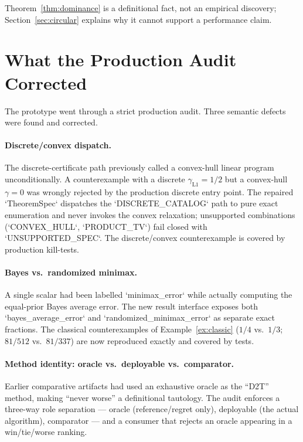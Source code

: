 \documentclass[11pt]{article}
\begin{document}
Theorem~\ref{thm:dominance} is a definitional fact, not an empirical discovery; Section~\ref{sec:circular} explains why it cannot support a performance claim.

\section{What the Production Audit Corrected}\label{sec:audit}

The prototype went through a strict production audit. Three semantic defects were found and corrected.

\paragraph{Discrete/convex dispatch.}
The discrete-certificate path previously called a convex-hull linear program unconditionally. A counterexample with a discrete $\gamma_{\mathrm{L1}}=1/2$ but a convex-hull $\gamma=0$ was wrongly rejected by the production discrete entry point. The repaired `TheoremSpec` dispatches the `DISCRETE\_CATALOG` path to pure exact enumeration and never invokes the convex relaxation; unsupported combinations (`CONVEX\_HULL`, `PRODUCT\_TV`) fail closed with `UNSUPPORTED\_SPEC`. The discrete/convex counterexample is covered by production kill-tests.

\paragraph{Bayes vs.\ randomized minimax.}
A single scalar had been labelled `minimax\_error` while actually computing the equal-prior Bayes average error. The new result interface exposes both `bayes\_average\_error` and `randomized\_minimax\_error` as separate exact fractions. The classical counterexamples of Example~\ref{ex:classic} ($1/4$ vs.\ $1/3$; $81/512$ vs.\ $81/337$) are now reproduced exactly and covered by tests.

\paragraph{Method identity: oracle vs.\ deployable vs.\ comparator.}
Earlier comparative artifacts had used an exhaustive oracle as the ``D2T'' method, making ``never worse'' a definitional tautology. The audit enforces a three-way role separation --- oracle (reference/regret only), deployable (the actual algorithm), comparator --- and a consumer that rejects an oracle appearing in a win/tie/worse ranking.
\end{document}
